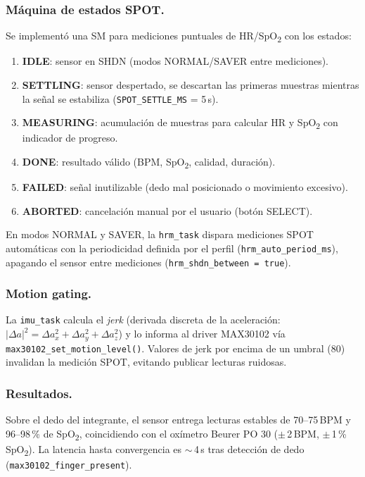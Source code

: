 \documentclass[letterpaper,11pt]{article}
\begin{document}
\subsubsection{Máquina de estados SPOT.} Se implementó una SM para mediciones puntuales
de HR/SpO\textsubscript{2} con los estados:
\begin{enumerate}
    \item \textbf{IDLE}: sensor en SHDN (modos NORMAL/SAVER entre mediciones).
    \item \textbf{SETTLING}: sensor despertado, se descartan las primeras muestras mientras
    la señal se estabiliza (\texttt{SPOT\_SETTLE\_MS} = 5\,s).
    \item \textbf{MEASURING}: acumulación de muestras para calcular HR y SpO\textsubscript{2}
    con indicador de progreso.
    \item \textbf{DONE}: resultado válido (BPM, SpO\textsubscript{2}, calidad, duración).
    \item \textbf{FAILED}: señal inutilizable (dedo mal posicionado o movimiento excesivo).
    \item \textbf{ABORTED}: cancelación manual por el usuario (botón SELECT).
\end{enumerate}
En modos NORMAL y SAVER, la \texttt{hrm\_task} dispara mediciones SPOT automáticas con la
periodicidad definida por el perfil (\texttt{hrm\_auto\_period\_ms}), apagando el sensor
entre mediciones (\texttt{hrm\_shdn\_between = true}).

\subsubsection{Motion gating.} La \texttt{imu\_task} calcula el \textit{jerk} (derivada
discreta de la aceleración: $|\Delta a|^2 = \Delta a_x^2 + \Delta a_y^2 + \Delta a_z^2$)
y lo informa al driver MAX30102 vía \texttt{max30102\_set\_motion\_level()}. Valores de jerk
por encima de un umbral (80) invalidan la medición SPOT, evitando publicar lecturas ruidosas.

\subsubsection{Resultados.} Sobre el dedo del integrante, el sensor entrega lecturas estables
de 70--75\,BPM y 96--98\,\% de SpO\textsubscript{2}, coincidiendo con el oxímetro Beurer
PO 30 ($\pm$\,2\,BPM, $\pm$\,1\,\% SpO\textsubscript{2}). La latencia hasta convergencia es
$\sim$\,4\,s tras detección de dedo (\texttt{max30102\_finger\_present}).
\end{document}
